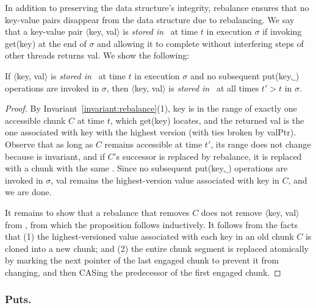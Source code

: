 In addition to preserving the data structure's integrity, rebalance ensures that no key-value pairs disappear from the data structure due to rebalancing. 
We say that a key-value pair $\langle$key, val$ \rangle$ is \emph{stored in} \kiwi\ at time $t$ in execution $\sigma$ if invoking get(key) at the end of $\sigma$
and allowing it to complete without interfering steps of other threads returns val. We show the following:

\begin{proposition}
If $\langle$key, val$ \rangle$ is \emph{stored in} \kiwi\ at time $t$ in execution $\sigma$ and no subsequent put(key,$\_$)  operations are invoked in $\sigma$, 
then $\langle$key, val$ \rangle$ is \emph{stored in} \kiwi\ at all times $t' > t$ in  $\sigma$.
\label{proposition:no-loss}
\end{proposition}
\begin{proof}
By Invariant~\ref{invariant:rebalance}(1), key is in the range of exactly one accessible chunk $C$ at time $t$,  which  get(key) locates, 
and the returned val is the one associated with key with the highest version (with ties broken by valPtr). 
Observe that as long as $C$ remains accessible at time $t'$, its range does not change because  is invariant, and if $C$'s successor is 
replaced by rebalance, it is replaced with a chunk with the same . 
Since no   subsequent put(key,$\_$)  operations are invoked in $\sigma$, val remains the highest-version value associated with key in $C$, and we are done.

It remains to show that a rebalance that removes $C$ does not remove $\langle$key, val$ \rangle$ from \kiwi, from which the proposition follows   inductively.
It follows from the facts that (1) the highest-versioned value associated with each key in an old chunk $C$ is cloned into a new chunk; and 
(2) the entire chunk segment is replaced atomically by marking the next pointer of the last engaged chunk to prevent it from changing, and then 
CASing the predecessor of the first engaged chunk.
 \end{proof}

\subsubsection{Puts.} 
\label{ssec:put-proof}

